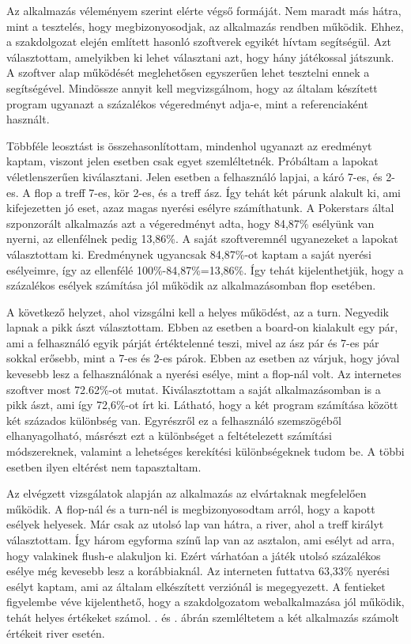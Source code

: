
Az alkalmazás véleményem szerint elérte végső formáját. Nem maradt más hátra, mint a tesztelés, hogy megbizonyosodjak, az alkalmazás rendben működik. Ehhez, a szakdolgozat elején említett hasonló szoftverek egyikét hívtam segítségül. Azt választottam, amelyikben ki lehet választani azt, hogy hány játékossal játszunk. A szoftver alap működését meglehetősen egyszerűen lehet tesztelni ennek a segítségével. Mindössze annyit kell megvizsgálnom, hogy az általam készített program ugyanazt a százalékos végeredményt adja-e, mint a referenciaként használt.

Többféle leosztást is összehasonlítottam, mindenhol ugyanazt az eredményt kaptam, viszont jelen esetben csak egyet szemléltetnék. Próbáltam a lapokat véletlenszerűen kiválasztani. Jelen esetben a felhasználó lapjai, a káró 7-es, és 2-es. A flop a treff 7-es, kör 2-es, és a treff ász. Így tehát két párunk alakult ki, ami kifejezetten jó eset, azaz magas nyerési esélyre számíthatunk. A Pokerstars által szponzorált alkalmazás azt a végeredményt adta, hogy 84,87\% esélyünk van nyerni, az ellenfélnek pedig 13,86\%. A saját szoftveremnél ugyanezeket a lapokat választottam ki. Eredménynek ugyancsak 84,87\%-ot kaptam a saját nyerési esélyeimre, így az ellenfélé 100\%-84,87\%=13,86\%. Így tehát kijelenthetjük, hogy a százalékos esélyek számítása jól működik az alkalmazásomban flop esetében.

A következő helyzet, ahol vizsgálni kell a helyes működést, az a turn. Negyedik lapnak a pikk ászt választottam. Ebben az esetben a board-on kialakult egy pár, ami a felhasználó egyik párját értéktelenné teszi, mivel az ász pár és 7-es pár sokkal erősebb, mint a 7-es és 2-es párok. Ebben az esetben az várjuk, hogy jóval kevesebb lesz a felhasználónak a nyerési esélye, mint a flop-nál volt. Az internetes szoftver most 72.62\%-ot mutat. Kiválasztottam a saját alkalmazásomban is a pikk ászt, ami így 72,6\%-ot írt ki. Látható, hogy a két program számítása között két százados különbség van. Egyrészről ez a felhasználó szemszögéből elhanyagolható, másrészt ezt a különbséget a feltételezett számítási módszereknek, valamint a lehetséges kerekítési különbségeknek tudom be. A többi esetben ilyen eltérést nem tapasztaltam.

Az elvégzett vizsgálatok alapján az alkalmazás az elvártaknak megfelelően működik. A flop-nál és a turn-nél is megbizonyosodtam arról, hogy a kapott esélyek helyesek. Már csak az utolsó lap van hátra, a river, ahol a treff királyt választottam. Így három egyforma színű lap van az asztalon, ami esélyt ad arra, hogy valakinek flush-e alakuljon ki. Ezért várhatóan a játék utolsó százalékos esélye még kevesebb lesz a korábbiaknál. Az interneten futtatva 63,33\% nyerési esélyt kaptam, ami az általam elkészített verziónál is megegyezett. A fentieket figyelembe véve kijelenthető, hogy a szakdolgozatom webalkalmazása jól működik, tehát helyes értékeket számol. . és . ábrán szemléltetem a két alkalmazás számolt értékeit river esetén.

